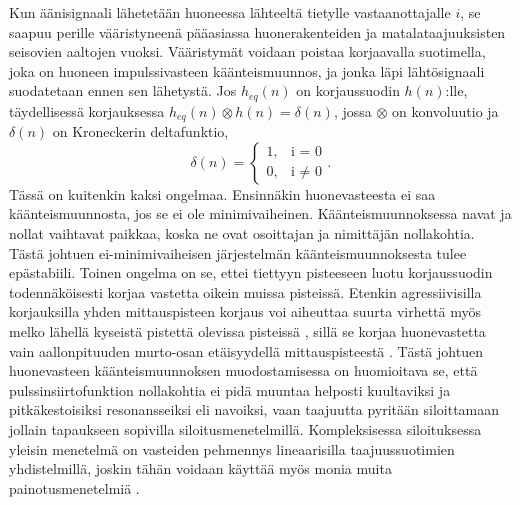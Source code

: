 \documentclass[finnish,12pt]{article}
\begin{document}
Kun äänisignaali lähetetään huoneessa lähteeltä tietylle vastaanottajalle $i$, se saapuu perille vääristyneenä pääasiassa huonerakenteiden ja matalataajuuksisten seisovien aaltojen vuoksi. Vääristymät voidaan poistaa korjaavalla suotimella, joka on huoneen impulssivasteen käänteismuunnos, ja jonka läpi lähtösignaali suodatetaan ennen sen lähetystä. Jos $h_{eq}(n)$ on korjaussuodin $h(n)$:lle, täydellisessä korjauksessa $h_{eq}(n) \otimes h(n) = \delta(n)$, jossa $\otimes$ on konvoluutio ja $\delta(n)$ on Kroneckerin deltafunktio, \begin{equation}
 \label{Kronecker delta}
 \delta(n) = \begin{cases}
	1, 	& \mbox{i = 0} \\
	0,  & \mbox{i $\neq$ 0}
\end{cases}.
\end{equation} Tässä on kuitenkin kaksi ongelmaa. Ensinnäkin huonevasteesta ei saa käänteismuunnosta, jos se ei ole minimivaiheinen. Käänteismuunnoksessa navat ja nollat vaihtavat paikkaa, koska ne ovat osoittajan ja nimittäjän nollakohtia. Tästä johtuen ei-minimivaiheisen järjestelmän käänteismuunnoksesta tulee epästabiili. Toinen ongelma on se, ettei tiettyyn pisteeseen luotu korjaussuodin todennäköisesti korjaa vastetta oikein muissa pisteissä. Etenkin agressiivisilla korjauksilla yhden mittauspisteen korjaus voi aiheuttaa suurta virhettä myös melko lähellä kyseistä pistettä olevissa pisteissä \cite{S.J.Elliot1989}, sillä se korjaa huonevastetta vain aallonpituuden murto-osan etäisyydellä mittauspisteestä \cite{ACarini2012}. Tästä johtuen huonevasteen käänteismuunnoksen muodostamisessa on huomioitava se, että pulssinsiirtofunktion nollakohtia ei pidä muuntaa helposti kuultaviksi ja pitkäkestoisiksi resonansseiksi eli navoiksi, vaan taajuutta pyritään siloittamaan jollain tapaukseen sopivilla siloitusmenetelmillä. Kompleksisessa siloituksessa yleisin menetelmä on vasteiden pehmennys lineaarisilla taajuussuotimien yhdistelmillä, joskin tähän voidaan käyttää myös monia muita painotusmenetelmiä \cite{MKarjalainen2005}. 
\end{document}
